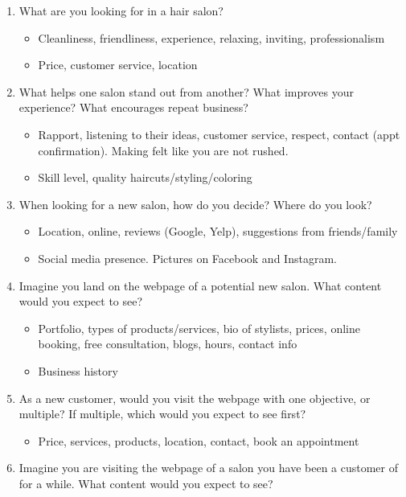 \begin{enumerate}
\item
  What are you looking for in a hair salon?
  \begin{itemize}
  \item
    Cleanliness, friendliness, experience, relaxing, inviting, professionalism
  \item
    Price, customer service, location
  \end{itemize}
\item
  What helps one salon stand out from another? What improves your experience? What encourages repeat business?
  \begin{itemize}
  \item
    Rapport, listening to their ideas, customer service, respect, contact (appt confirmation). Making felt like you are not rushed.
  \item
    Skill level, quality haircuts/styling/coloring
  \end{itemize}
\item
  When looking for a new salon, how do you decide? Where do you look?
  \begin{itemize}
  \item
    Location, online, reviews (Google, Yelp), suggestions from friends/family
  \item
    Social media presence. Pictures on Facebook and Instagram.
  \end{itemize}
\item
  Imagine you land on the webpage of a potential new salon. What content would you expect to see?
  \begin{itemize}
  \item
    Portfolio, types of products/services, bio of stylists, prices, online booking, free consultation, blogs, hours, contact info
  \item
    Business history
  \end{itemize}
\item
  As a new customer, would you visit the webpage with one objective, or multiple? If multiple, which would you expect to see first?
  \begin{itemize}
  \item
    Price, services, products, location, contact, book an appointment
  \end{itemize}
\item
  Imagine you are visiting the webpage of a salon you have been a customer of for a while. What content would you expect to see?
  \begin{itemize}

\end{itemize}
\end{enumerate}
